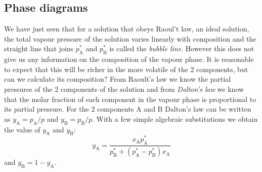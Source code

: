 \documentclass[12pt,a4paper]{report}
\begin{document}
   \subsection*{Phase diagrams}
   We have just seen that for a solution that obeys Raoul't law, an ideal solution, the total vapour pressure of the solution varies linearly with composition and the straight line that joins $p^{*}_{\mathrm{A}}$ and $p^{*}_{\mathrm{B}}$ is called the \textit{bubble line}. However this does not give us any information on the composition of the vapour phase. It is reasonable to expect that this will be richer in the more volatile of the 2 components, but can we calculate its composition? From Raoult's law we know the partial pressures of the 2 components of the solution and from \textit{Dalton's law} we know that the molar fraction of each component in the vapour phase is proportional to its partial pressure. For the 2 components A and B Dalton's law can be written as $y_{\mathrm{A}}=p_{\mathrm{A}}/{p}$ and $y_{\mathrm{B}}=p_{\mathrm{B}}/{p}$. With a few simple algebraic substitutions we obtain the value of $y_{\mathrm{A}}$ and $y_{\mathrm{B}}$:
   \begin{equation*}
   y_{\mathrm{A}}=\frac{x_{\mathrm{A}} p^{*}_{\mathrm{A}}}{p^{*}_{\mathrm{B}}+(p^{*}_{\mathrm{A}}-p^{*}_{\mathrm{B}})x_{\mathrm{A}}}
   \end{equation*}    
   and $y_{\mathrm{B}}= 1-y_{\mathrm{A}}$.
   
\end{document}

